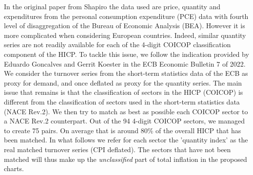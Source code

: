 \quad In the original paper from Shapiro the data used are price, quantity and expenditures from the personal consumption expenditure (PCE) data with fourth level of disaggregation of the Bureau of Economic Analysis (BEA).
However it is more complicated when considering European countries. 
Indeed, similar quantity series are not readily available for each of the 4-digit COICOP classification component of the HICP. 
\bigbreak
To tackle this issue, we follow the indication provided by Eduardo Goncalves and Gerrit Koester in the ECB Economic Bulletin 7 of 2022.
We consider the turnover series from the short-term statistics data of the ECB as proxy for demand, and once deflated as proxy for the quantity series.
The main issue that remains is that the classification of sectors in the HICP (COICOP) is different from the classification of sectors used in the short-term statistics data (NACE Rev.2).
We then try to match as best as possible each COICOP sector to a NACE Rev.2 counterpart. 
Out of the 94 4-digit COICOP sectors, we managed to create 75 pairs. 
On average that is around 80\% of the overall HICP that has been matched.
In what follows we refer for each sector the 'quantity index' as the real matched turnover series (CPI deflated). 
The sectors that have not been matched will thus make up the \textit{unclassified} part of total inflation in the proposed charts.